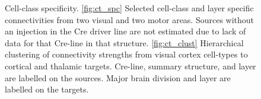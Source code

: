\newpage

\begin{figure}[H]
    \newline
    
    \caption{  Cell-class specificity. \ref{fig:ct_spc} Selected cell-class and layer specific connectivities from two visual and two motor areas.
	 Sources without an injection in the Cre driver line are not estimated due to lack of data for that Cre-line in that structure.
    		\ref{fig:ct_clust}
		Hierarchical clustering of connectivity strengths from visual cortex cell-types to cortical and thalamic targets.
		Cre-line, summary structure, and layer are labelled on the sources.
		Major brain division and layer are labelled on the targets.}
\label{fig:data_ct}
\end{figure}

\newpage


